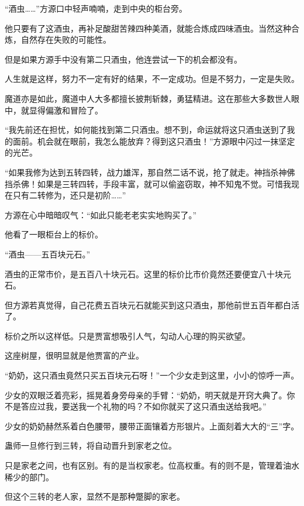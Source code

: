 
\begin{this_body}



“酒虫……”方源口中轻声喃喃，走到中央的柜台旁。

他只要有了这酒虫，再补足酸甜苦辣四种美酒，就能合炼成四味酒虫。当然这种合炼，自然存在失败的可能性。

但是如果方源手中没有第二只酒虫，他连尝试一下的机会都没有。

人生就是这样，努力不一定有好的结果，不一定成功。但是不努力，一定是失败。

魔道亦是如此，魔道中人大多都擅长披荆斩棘，勇猛精进。这在那些大多数世人眼中，就显得偏激和冒险了。

“我先前还在担忧，如何能找到第二只酒虫。想不到，命运就将这只酒虫送到了我的面前。机会就在眼前，我怎么能放弃？得到这只酒虫！”方源眼中闪过一抹坚定的光芒。

“如果我修为达到五转四转，战力雄浑，那自然二话不说，抢了就走。神挡杀神佛挡杀佛！如果是三转四转，手段丰富，就可以偷盗窃取，神不知鬼不觉。可惜我现在只有二转修为，还只是初阶……”

方源在心中暗暗叹气：“如此只能老老实实地购买了。”

他看了一眼柜台上的标价。

“酒虫——五百块元石。”

酒虫的正常市价，是五百八十块元石。这里的标价比市价竟然还要便宜八十块元石。

但方源若真觉得，自己花费五百块元石就能买到这只酒虫，那他前世五百年都白活了。

标价之所以这样低。只是贾富想吸引人气，勾动人心理的购买欲望。

这座树屋，很明显就是他贾富的产业。

“奶奶，这只酒虫竟然只买五百块元石呀！”一个少女走到这里，小小的惊呼一声。

少女的双眼泛着亮彩，摇晃着身旁母亲的手臂：“奶奶，明天就是开窍大典了。你不是答应过我，要送我一个礼物的吗？不如你就买了这只酒虫送给我吧。”

少女的奶奶赫然系着白色腰带，腰带正面镶着方形银片。上面刻着大大的“三”字。

蛊师一旦修行到三转，将自动晋升到家老之位。

只是家老之间，也有区别。有的是当权家老。位高权重。有的则不是，管理着油水稀少的部门。

但这个三转的老人家，显然不是那种蹩脚的家老。


\end{this_body}
